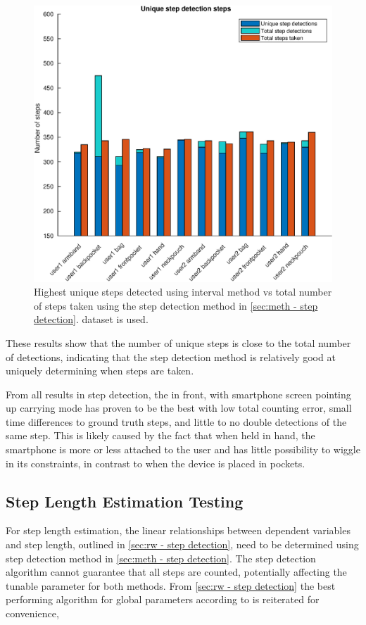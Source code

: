 \begin{figure}[H]
	\centering
	\includegraphics[width=0.7\linewidth]{images/20201127_1626_Unique_step_detection_steps}
	\setlength{\belowcaptionskip}{-10pt}
\caption[False positives and true positives step detection comparison]{Highest unique steps detected using interval method vs total number of steps taken using the step detection method in \cref{sec:meth - step detection}. \citet{Brajdic2013} dataset is used. }
\label{fig:sd_tp_fp_comparison}
\end{figure}

These results show that the number of unique steps is close to the total number of detections, indicating that the step detection method is relatively good at uniquely determining when steps are taken. \par 

From all results in step detection, the in front, with smartphone screen pointing up carrying mode has proven to be the best with low total counting error, small time differences to ground truth steps, and little to no double detections of the same step. This is likely caused by the fact that when held in hand, the smartphone is more or less attached to the user and has little possibility to wiggle in its constraints, in contrast to when the device is placed in pockets. 

\subsection{Step Length Estimation Testing}
\label{sec:results-step_length_estimation}
For step length estimation, the linear relationships between dependent variables and step length, outlined in \cref{sec:rw - step detection}, need to be determined using step detection method in \cref{sec:meth - step detection}. The step detection algorithm cannot guarantee that all steps are counted, potentially affecting the tunable parameter for both methods.  From \cref{sec:rw - step detection} the best performing algorithm for global parameters according to \cite{Vezocnik2019} is reiterated for convenience,


